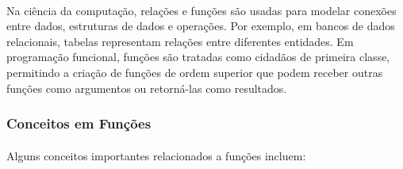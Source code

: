 \documentclass[12pt,a4paper]{article}
\begin{document}
\paragraph{}
Na ciência da computação, relações e funções são usadas para modelar conexões entre dados, estruturas de dados e operações. Por exemplo, em bancos de dados relacionais, tabelas representam relações entre diferentes entidades. Em programação funcional, funções são tratadas como cidadãos de primeira classe, permitindo a criação de funções de ordem superior que podem receber outras funções como argumentos ou retorná-las como resultados.

\subsubsection{Conceitos em Funções}
\paragraph{}
Alguns conceitos importantes relacionados a funções incluem:
\end{document}

